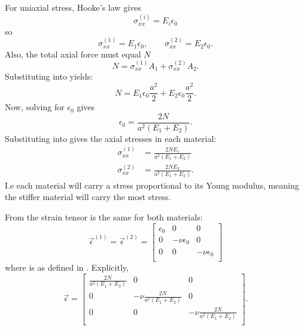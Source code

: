 \begin{derivation}
    For uniaxial stress, Hooke's law gives
    \begin{equation*}
      \sigma_{x x}^{(i)} = E_i \epsilon_0
    \end{equation*}
    so
    \begin{equation} \label{eq:31hooke}
      \sigma_{x x}^{(1)} = E_1 \epsilon_0, \qquad \sigma_{x x}^{(2)} = E_2 \epsilon_0
    .\end{equation}
    Also, the total axial force must equal $N$
    \begin{equation} \label{eq:31axial}
      N = \sigma_{x x}^{(1)}A_1 + \sigma_{x x}^{(2)} A_2
    .\end{equation}
    Substituting  into  yields:
    \begin{equation} \label{eq:31n}
      N = E_1 \epsilon_0 \frac{a^2}{2} + E_2 \epsilon_0 \frac{a^2}{2}
    .\end{equation}
    Now, solving  for $\epsilon_0$ gives
    \begin{equation} \label{eq:31ep0}
      \epsilon_0 = \frac{2N}{a^2 \left( E_1 + E_2 \right)}
    .\end{equation}
    Substituting  into  gives the axial stresses in each material:
    \begin{align} 
      \sigma_{x x}^{(1)} &= \frac{2N E_1}{a^2 \left( E_1 + E_2 \right)} \label{eq:31sigmaxx1} \\
      \sigma_{x x}^{(2)} &= \frac{2N E_2}{a^2 \left( E_1 + E_2 \right)} \label{eq:31sigmaxx2}
    .\end{align}
    I.e each material will carry a stress proportional to its Young modulus, meaning the stiffer material will carry the most stress.

    From  the strain tensor is the same for both materials:
    \begin{equation*}
      \Vec{\epsilon}^{(1)} = \Vec{\epsilon}^{(2)} = \begin{bmatrix}
        \epsilon_0 & 0 & 0\\
      0 & -\nu \epsilon_0 & 0\\
      0 & 0 & -\nu\epsilon_0\\
      \end{bmatrix}
    \end{equation*}
    where is as defined in .
    Explicitly,
    \begin{equation*}
      \Vec{\epsilon} = \begin{bmatrix}
        \frac{2N}{a^2 \left( E_1 + E_2 \right)} & 0 & 0\\
      0 & -\nu \frac{2N}{a^2 \left( E_1 + E_2 \right)} & 0 \\
      0 & 0 & - \nu \frac{2N}{a^2 \left( E_1 + E_2 \right)}\\
      \end{bmatrix}
    .\end{equation*}
    

\end{derivation}
